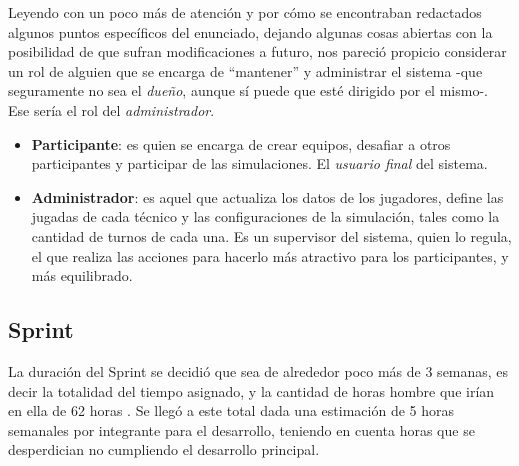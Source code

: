 Leyendo con un poco más de atención y por cómo se encontraban redactados algunos puntos específicos del enunciado, dejando algunas cosas abiertas con la posibilidad de que sufran modificaciones a futuro, nos pareció propicio considerar un rol de alguien que se encarga de ``mantener'' y administrar el sistema -que seguramente no sea el \emph{dueño}, aunque sí puede que esté dirigido por el mismo-. Ese sería el rol del \emph{administrador}.
\begin{itemize}
\item \textbf{Participante}: es quien se encarga de crear equipos, desafiar a otros participantes y participar de las simulaciones. El \textit{usuario final} del sistema.
\item \textbf{Administrador}: es aquel que actualiza los datos de los jugadores, define las jugadas de cada técnico y las configuraciones de la simulación, tales como la cantidad de turnos de cada una. Es un supervisor del sistema, quien lo regula, el que realiza las acciones para hacerlo más atractivo para los participantes, y más equilibrado.
\end{itemize}

\subsection{Sprint}
La duración del Sprint se decidió que sea de alrededor poco más de 3 semanas, es decir la totalidad del tiempo asignado, y la cantidad de horas hombre que irían en ella de 62 horas . Se llegó a este total dada una estimación de 5 horas semanales por integrante para el desarrollo, teniendo en cuenta horas que se desperdician no cumpliendo el desarrollo principal.\\


